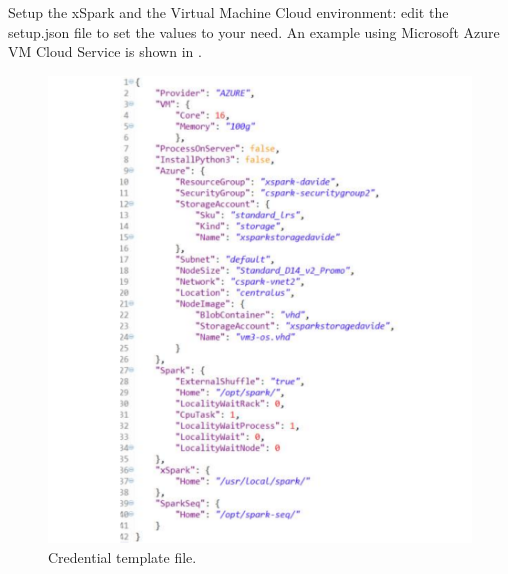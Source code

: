 Setup the xSpark and the Virtual Machine Cloud environment: edit the 
setup.json file to set the values to your need. An
example using Microsoft Azure VM Cloud Service is shown in .

\begin{figure}[thbp]
	\hspace*{-2.5cm}
	\centering
	\includegraphics[width=18cm]{images/xspark_dagsymb_setup.pdf}
	\caption{Credential template file.}
	\label{fig:xspark_dagsymb_setup}
\end{figure}


